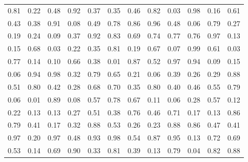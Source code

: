 \begin{center}
\begin{tabular}{llllllllllll}
0.81 & 0.22 & 0.48 & 0.92 & 0.37 & 0.35 & 0.46 & 0.82 & 0.03 & 0.98 & 0.16 & 0.61 \\
0.43 & 0.38 & 0.91 & 0.08 & 0.49 & 0.78 & 0.86 & 0.96 & 0.48 & 0.06 & 0.79 & 0.27 \\
0.19 & 0.24 & 0.09 & 0.37 & 0.92 & 0.83 & 0.69 & 0.74 & 0.77 & 0.76 & 0.97 & 0.13 \\
0.15 & 0.68 & 0.03 & 0.22 & 0.35 & 0.81 & 0.19 & 0.67 & 0.07 & 0.99 & 0.61 & 0.03 \\
0.77 & 0.14 & 0.10 & 0.66 & 0.38 & 0.01 & 0.87 & 0.52 & 0.97 & 0.94 & 0.09 & 0.15 \\
0.06 & 0.94 & 0.98 & 0.32 & 0.79 & 0.65 & 0.21 & 0.06 & 0.39 & 0.26 & 0.29 & 0.88 \\
0.51 & 0.80 & 0.42 & 0.28 & 0.68 & 0.70 & 0.35 & 0.80 & 0.40 & 0.46 & 0.55 & 0.79 \\
0.06 & 0.01 & 0.89 & 0.08 & 0.57 & 0.78 & 0.67 & 0.11 & 0.06 & 0.28 & 0.57 & 0.12 \\
0.22 & 0.13 & 0.13 & 0.27 & 0.51 & 0.38 & 0.76 & 0.46 & 0.71 & 0.17 & 0.13 & 0.86 \\
0.79 & 0.41 & 0.17 & 0.32 & 0.88 & 0.53 & 0.26 & 0.23 & 0.88 & 0.86 & 0.47 & 0.41 \\
0.97 & 0.20 & 0.97 & 0.48 & 0.93 & 0.98 & 0.54 & 0.87 & 0.95 & 0.13 & 0.72 & 0.69 \\
0.53 & 0.14 & 0.69 & 0.90 & 0.33 & 0.81 & 0.39 & 0.13 & 0.79 & 0.04 & 0.82 & 0.88
\end{tabular}
\end{center}

